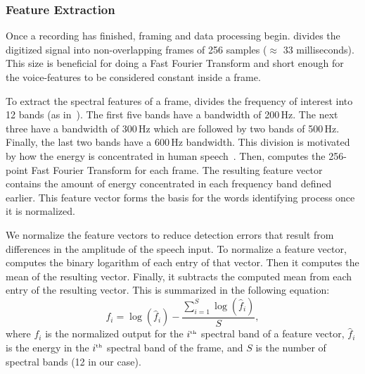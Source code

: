 \subsubsection{Feature Extraction}
Once a recording has finished, framing and data processing begin. \cim divides the digitized signal into non-overlapping frames of 256 samples ($\approx$ 33 milliseconds). This size is beneficial for doing a Fast Fourier Transform and short enough for the voice-features to be considered constant inside a frame.

To extract the spectral features of a frame, \cim divides the frequency of interest into 12 bands (as in~\cite{hopper1992}). The first five bands have a bandwidth of 200\,Hz. The next three have a bandwidth of 300\,Hz which are followed by two bands of 500\,Hz. Finally, the last two bands have a 600\,Hz bandwidth. This division is motivated by how the energy is concentrated in human speech~\cite{hopper1992}. Then, \cim computes the 256-point Fast Fourier Transform for each frame. The resulting feature vector contains the amount of energy concentrated in each frequency band defined earlier. This feature vector forms the basis for the words identifying process once it is normalized.

We normalize the feature vectors to reduce detection errors that result from differences in the amplitude of the speech input. To normalize a feature vector, \cim computes the binary logarithm of each entry of that vector. 
Then it computes the mean of the resulting vector. Finally, it subtracts the computed mean from each entry of the resulting vector. This is summarized in the following equation: 
\begin{equation}
    f_i = \log(\hat{f}_i) - \frac{\sum\limits^S_{i=1}\log(\hat{f}_i)}{S},
\end{equation}
where $f_i$ is the normalized output for the $i^{\text{\tiny th}}$ spectral band of a feature vector, $\hat{f}_i$ is the energy in the $i^{\text{\tiny th}}$ spectral band of the frame, and $S$ is the number of spectral bands (12 in our case). 

